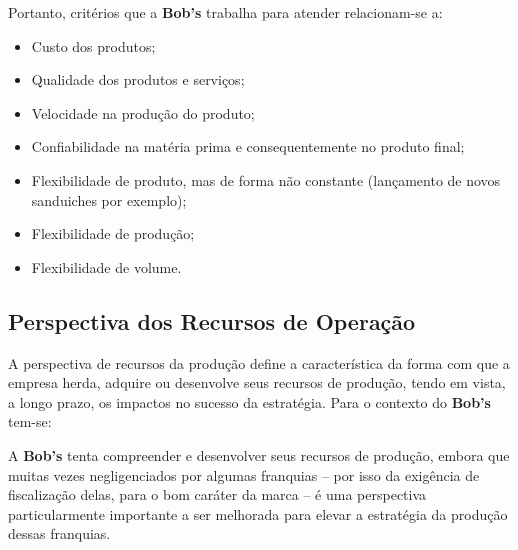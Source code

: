 			Portanto, critérios que a \textbf{Bob’s} trabalha para atender relacionam-se a:

			\begin{itemize}
				\item{Custo dos produtos;}
				\item{Qualidade dos produtos e serviços;}
				\item{Velocidade na produção do produto;}
				\item{Confiabilidade na matéria prima e consequentemente no produto final;}
				\item{Flexibilidade de produto, mas de forma não constante (lançamento de novos sanduiches por exemplo);}
				\item{Flexibilidade de produção;}
				\item{Flexibilidade de volume.}
			\end{itemize}


		\subsection[Perspectiva dos Recursos de Operação]{Perspectiva dos Recursos de Operação}
		\label{sec:dados_perspOeste}

			A perspectiva de recursos da produção define a característica da forma com que a empresa herda, adquire ou desenvolve seus recursos de produção, tendo em vista, a longo prazo, os impactos no sucesso da estratégia. Para o contexto do \textbf{Bob’s} tem-se:

			A \textbf{Bob’s} tenta compreender e desenvolver seus recursos de produção, embora que muitas vezes negligenciados por algumas franquias – por isso da exigência de fiscalização delas, para o bom caráter da marca – é uma perspectiva particularmente importante a ser melhorada para elevar a estratégia da produção dessas franquias. \cite{lamonica}